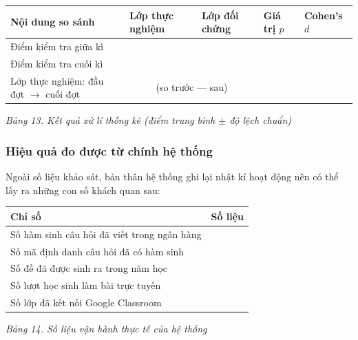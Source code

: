 
\begin{center}
\begin{tabular}{|p{5.0cm}|p{2.2cm}|p{2.2cm}|p{1.8cm}|p{1.8cm}|}
\hline
\textbf{Nội dung so sánh} & \textbf{Lớp thực nghiệm} & \textbf{Lớp đối chứng} &
\textbf{Giá trị $p$} & \textbf{Cohen's $d$} \\ \hline
Điểm kiểm tra giữa kì \dotfill & & & & \\ \hline
Điểm kiểm tra cuối kì \dotfill & & & & \\ \hline
Lớp thực nghiệm: đầu đợt $\rightarrow$ cuối đợt &
\multicolumn{2}{c|}{(so trước --- sau)} & & \\ \hline
\end{tabular}
\end{center}
\textit{Bảng 13. Kết quả xử lí thống kê (điểm trung bình $\pm$ độ lệch chuẩn)}


\subsubsection{Hiệu quả đo được từ chính hệ thống}

Ngoài số liệu khảo sát, bản thân hệ thống ghi lại nhật kí hoạt động nên có thể
lấy ra những con số khách quan sau:

\begin{center}
\begin{tabular}{|p{8.4cm}|c|}
\hline
\textbf{Chỉ số} & \textbf{Số liệu} \\ \hline
Số hàm sinh câu hỏi đã viết trong ngân hàng & \\ \hline
Số mã định danh câu hỏi đã có hàm sinh & \\ \hline
Số đề đã được sinh ra trong năm học & \\ \hline
Số lượt học sinh làm bài trực tuyến & \\ \hline
Số lớp đã kết nối Google Classroom & \\ \hline
\end{tabular}
\end{center}
\textit{Bảng 14. Số liệu vận hành thực tế của hệ thống}

